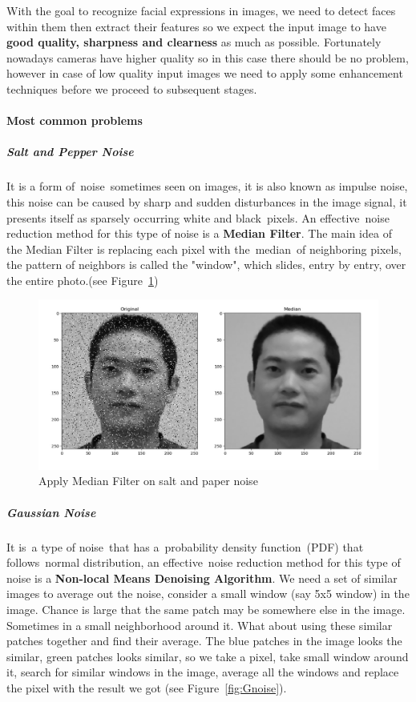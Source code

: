 With the goal to recognize facial expressions in images, we need to detect faces within them then extract their features so we expect the input image to have \textbf{good quality, sharpness and clearness} as much as possible.\newline
Fortunately nowadays cameras have higher quality so in this case there should be no problem, however in case of low quality input images we need to apply some enhancement techniques before we proceed to subsequent stages.

\paragraph{Most common problems}
\subparagraph{Salt and Pepper Noise}
It is a form of noise sometimes seen on images, it is also known as impulse noise, this noise can be caused by sharp and sudden disturbances in the image signal, it presents itself as sparsely occurring white and black pixels.\newline
An effective noise reduction method for this type of noise is a \textbf{Median Filter}.\newline
The main idea of the Median Filter is replacing each pixel with the median of neighboring pixels, the pattern of neighbors is called the "window", which slides, entry by entry, over the entire photo.(see Figure~\ref{fig:median})


\begin{figure}%
	\centering
	\includegraphics[width=.5\linewidth]{images/salt_pepper.jpg}
	\caption{Apply Median Filter on salt and paper noise}
	\label{fig:median}
\end{figure}

\subparagraph{Gaussian Noise}
It is a type of noise that has a probability density function (PDF) that follows normal distribution, an effective noise reduction method for this type of noise is a \textbf{Non-local Means Denoising Algorithm}.\newline
We need a set of similar images to average out the noise, consider a small window (say 5x5 window) in the image. Chance is large that the same patch may be somewhere else in the image. Sometimes in a small neighborhood around it. What about using these similar patches together and find their average.\newline
The blue patches in the image looks the similar, green patches looks similar, so we take a pixel, take small window around it, search for similar windows in the image, average all the windows and replace the pixel with the result we got (see Figure~\ref{fig:Gnoise}).\newline 

